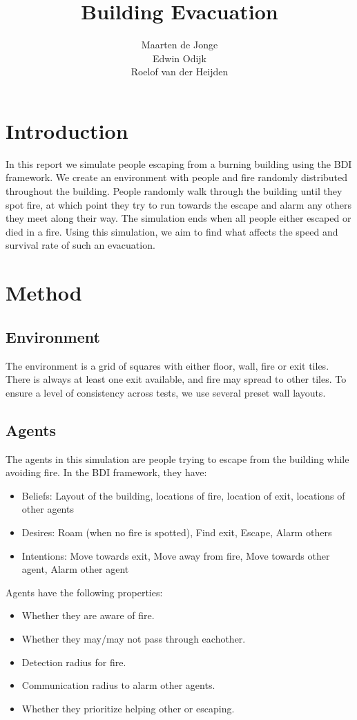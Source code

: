 \documentclass[a4paper]{article}
\title{Building Evacuation}
\author{Maarten de Jonge \\
        Edwin Odijk \\
        Roelof van der Heijden}
\begin{document}
\maketitle

\section{Introduction}
In this report we simulate people escaping from a burning building using the BDI framework. We create an environment with people and fire randomly distributed throughout the building. People randomly walk through the building until they spot fire, at which point they try to run towards the escape and alarm any others they meet along their way. The simulation ends when all people either escaped or died in a fire.
Using this simulation, we aim to find what affects the speed and survival rate of such an evacuation.

\section{Method}

\subsection{Environment}
The environment is a grid of squares with either floor, wall, fire or exit tiles. There is always at least one exit available, and fire may spread to other tiles. To ensure a level of consistency across tests, we use several preset wall layouts.

\subsection{Agents}
The agents in this simulation are people trying to escape from the building while avoiding fire. In the BDI framework, they have:
\begin{itemize}
\item Beliefs: Layout of the building, locations of fire, location of exit, locations of other agents
\item Desires: Roam (when no fire is spotted), Find exit, Escape, Alarm others
\item Intentions: Move towards exit, Move away from fire, Move towards other agent, Alarm other agent
\end{itemize}
Agents have the following properties:
\begin{itemize}
\item Whether they are aware of fire.
\item Whether they may/may not pass through eachother.
\item Detection radius for fire.
\item Communication radius to alarm other agents.
\item Whether they prioritize helping other or escaping.
\end{itemize}
\end{document}
